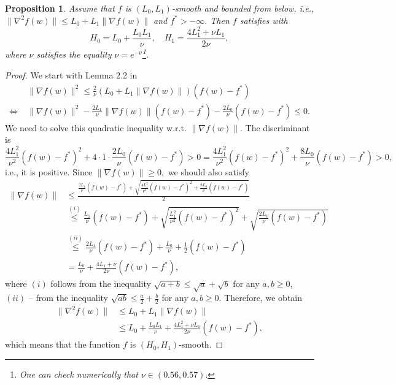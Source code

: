 \documentclass[a4paper,11pt]{article}
\newcommand{\1}{\mathbbm{1}}
\theoremstyle{plain}
\newtheorem{proposition}[theorem]{Proposition}
\begin{document}
\begin{proposition}
    Assume that $f$ is $(L_0,L_1)$-smooth and bounded from below, i.e., $\|\nabla^2f(w)\| \le L_0 + L_1\|\nabla f(w)\|$ and $f^* > -\infty.$ Then $f$ satisfies  with 
    \[
    H_0 = L_0 + \frac{L_0L_1}{\nu},\quad H_1 = \frac{4L_1^2+\nu L_1}{2\nu},
    \]
    where $\nu$ satisfies the equality $\nu = e^{-\nu}$\footnote{One can check numerically that $\nu\in(0.56,0.57).$}.
\end{proposition}
\begin{proof}
    We start with Lemma 2.2 in \citet{gorbunov2024methods}
    \begin{align*}
    &\|\nabla f(w)\|^2 \le \frac{2}{\nu}(L_0 + L_1\|\nabla f(w)\|)(f(w)-f^*) \\
    \Leftrightarrow\; &\|\nabla f(w)\|^2 -\frac{2L_1}{\nu}\|\nabla f(w)\|(f(w)-f^*) - \frac{2L_0}{\nu}(f(w)-f^*)  \le 0.
    \end{align*}
    We need to solve this quadratic inequality w.r.t. $\|\nabla f(w)\|.$ The discriminant is 
    \[
        \frac{4L_1^2}{\nu^2}(f(w)-f^*)^2 + 4\cdot 1\cdot \frac{2L_0}{\nu}(f(w)-f^*) > 0 = \frac{4L_1^2}{\nu^2}(f(w)-f^*)^2 + \frac{8L_0}{\nu}(f(w)-f^*) > 0,
    \]
    i.e., it is positive. Since $\|\nabla f(w)\|\ge 0,$ we should also satisfy 
    \begin{align*}
        \|\nabla f(w)\| &\le \frac{\frac{2L_1}{\nu}(f(w)-f^*) + \sqrt{\frac{4L_1^2}{\nu^2}(f(w)-f^*)^2 + \frac{8L_0}{\nu}(f(w)-f^*)}}{2}\\
        &\overset{(i)}{\le} \frac{L_1}{\nu}(f(w)-f^*) + \sqrt{\frac{L_1^2}{\nu^2}(f(w)-f^*)^2 } + \sqrt{\frac{2L_0}{\nu}(f(w)-f^*)}\\
        &\overset{(ii)}{\le} \frac{2L_1}{\nu}(f(w)-f^*) + \frac{L_0}{\nu} + \frac{1}{2}(f(w)-f^*)\\
        &= \frac{L_0}{\nu} + \frac{4L_1+\nu}{2\nu}(f(w)-f^*),
    \end{align*}
    where $(i)$ follows from the inequality $\sqrt{a+b} \le \sqrt{a} + \sqrt{b}$ for any $a,b\ge 0$, $(ii)$ -- from the inequality $\sqrt{ab} \le \frac{a}{2} + \frac{b}{2}$ for any $a,b\ge 0$. Therefore, we obtain
    \begin{align*}
        \|\nabla^2f(w)\| &\le L_0 + L_1\|\nabla f(w)\|\\
        &\le L_0 + \frac{L_0L_1}{\nu} + \frac{4L_1^2+\nu L_1}{2\nu}(f(w)-f^*),
    \end{align*}
    which means that the function $f$ is $(H_0,H_1)$-smooth.

\end{proof}
\end{document}
